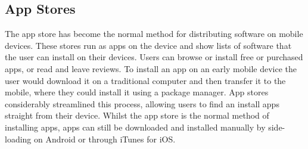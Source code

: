 \documentclass[thesis.tex]{subfiles}
\begin{document}
\subsection{App Stores}


The app store has become the normal method for distributing software
on mobile devices.  These stores run as apps on the device and show
lists of software that the user can install on their devices.  Users
can browse or install free or purchased apps, or read and leave
reviews.  To install an app on an early mobile device the user would
download it on a traditional computer and then transfer it to the
mobile, where they could install it using a package manager.  App
stores considerably streamlined this process, allowing users to find
an install apps straight from their device.  Whilst the app store is
the normal method of installing apps, apps can still be downloaded and
installed manually by side-loading on Android or through iTunes for
iOS.
\end{document}
